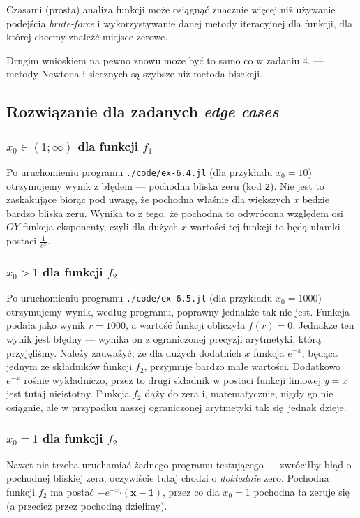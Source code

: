 \documentclass[10pt]{article}
\begin{document}
Czasami (prosta) analiza funkcji może osiągnąć znacznie więcej niż używanie podejścia \textit{brute-force} i wykorzystywanie danej metody iteracyjnej dla funkcji, dla której chcemy znaleźć miejsce zerowe.

Drugim wnioskiem na pewno znowu może być to samo co w zadaniu 4. — metody Newtona i siecznych są szybsze niż metoda bisekcji.

\subsection{Rozwiązanie dla zadanych \textit{edge cases}}

\subsubsection{$x_0 \in (1; \infty)$ dla funkcji $f_1$}

Po uruchomieniu programu \texttt{./code/ex-6.4.jl} (dla przykładu $x_0 = 10$) otrzymujemy wynik z błędem — pochodna bliska zeru (kod \texttt{2}). Nie jest to zaskakujące biorąc pod uwagę, że pochodna właśnie dla większych $x$ będzie bardzo bliska zeru. Wynika to z tego, że pochodna to odwrócona względem osi $OY$ funkcja eksponenty, czyli dla dużych $x$ wartości tej funkcji to będą ułamki postaci $\frac{1}{e^x}$.

\subsubsection{$x_0 > 1$ dla funkcji $f_2$}

Po uruchomieniu programu \texttt{./code/ex-6.5.jl} (dla przykładu $x_0 = 1000$) otrzymujemy wynik, według programu, poprawny jednakże tak nie jest. Funkcja podała jako wynik $r = 1000$, a wartość funkcji obliczyła $f(r) = 0$. Jednakże ten wynik jest błędny — wynika on z ograniczonej precyzji arytmetyki, którą przyjęliśmy. Należy zauważyć, że dla dużych dodatnich $x$ funkcja $e^{-x}$, będąca jednym ze składników funkcji $f_2$, przyjmuje bardzo małe wartości. Dodatkowo $e^{-x}$ rośnie wykładniczo, przez to drugi składnik w postaci funkcji liniowej $y = x$ jest tutaj nieistotny. Funkcja $f_2$ dąży do zera i, matematycznie, nigdy go nie osiągnie, ale w przypadku naszej ograniczonej arytmetyki tak się jednak dzieje.

\subsubsection{$x_0 = 1$ dla funkcji $f_2$}

Nawet nie trzeba uruchamiać żadnego programu testującego — zwróciłby błąd o pochodnej bliskiej zera, oczywiście tutaj chodzi o \textit{dokładnie} zero. Pochodna funkcji $f_2$ ma postać $-e^{-x} \boldsymbol{\cdot (x-1)}$, przez co dla $x_0 = 1$ pochodna ta zeruje się (a przecież przez pochodną dzielimy).
\end{document}
